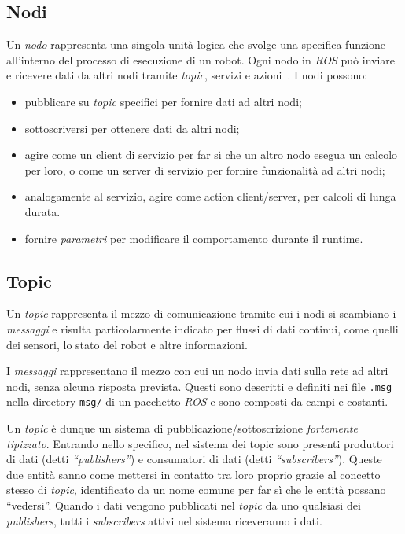 \subsection{Nodi}
Un \textit{nodo} rappresenta una singola unità logica che svolge una specifica 
funzione all’interno del processo di esecuzione di un robot. 
Ogni nodo in \textit{ROS} può inviare e ricevere dati da altri nodi tramite 
\textit{topic}, servizi e azioni~\cite{rosdocs}. I nodi possono:
\begin{itemize}
    \item pubblicare su \textit{topic} specifici per fornire dati ad altri nodi;
    \item sottoscriversi per ottenere dati da altri nodi;
    \item agire come un client di servizio per far sì che un altro nodo esegua un 
    calcolo per loro, o come un server di servizio per fornire funzionalità ad altri 
    nodi;
    \item analogamente al servizio, agire come action client/server, per calcoli di 
    lunga durata.
    \item fornire \textit{parametri} per modificare il comportamento 
    durante il runtime.
\end{itemize}

\subsection{Topic}
Un \textit{topic} rappresenta il mezzo di comunicazione tramite cui i nodi si 
scambiano i \textit{messaggi} e risulta particolarmente indicato per flussi di dati 
continui, come quelli dei sensori, lo stato del robot e altre informazioni.

I \textit{messaggi} rappresentano il mezzo con cui un nodo invia dati sulla rete
ad altri nodi, senza alcuna risposta prevista. Questi sono descritti e definiti nei file 
\verb|.msg| nella directory \verb|msg/| di un pacchetto \textit{ROS} e sono composti da 
campi e costanti.

Un \textit{topic} è dunque un sistema di pubblicazione/sottoscrizione \textit{fortemente tipizzato}.
Entrando nello specifico, nel sistema dei topic sono presenti produttori di dati (detti 
\textit{``publishers''}) e consumatori di dati (detti \textit{``subscribers''}). Queste due entità 
sanno come mettersi in contatto tra loro proprio grazie al concetto stesso di \textit{topic}, 
identificato da un nome comune per far sì che le entità possano ``vedersi''.
Quando i dati vengono pubblicati nel \textit{topic} da uno qualsiasi dei \textit{publishers}, 
tutti i \textit{subscribers} attivi nel sistema riceveranno i dati.

